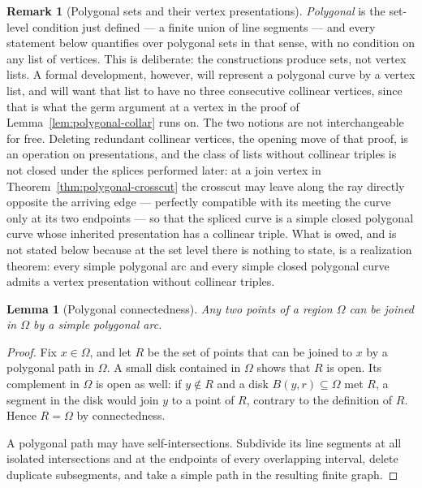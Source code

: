 \documentclass[11pt]{article}
\theoremstyle{mainplain}
\newtheorem{lemma}[theorem]{Lemma}
\theoremstyle{mainroman}
\theoremstyle{definition}
\newtheorem{remark}[theorem]{Remark}
\numberwithin{equation}{section}
\begin{document}
\begin{remark}[Polygonal sets and their vertex presentations]\label{rem:polygonal-presentation}
\emph{Polygonal} is the set-level condition just defined --- a finite
union of line segments --- and every statement below quantifies over
polygonal sets in that sense, with no condition on any list of
vertices. This is deliberate: the constructions produce sets, not
vertex lists. A formal development, however, will represent a
polygonal curve by a vertex list, and will want that list to have no
three consecutive collinear vertices, since that is what the germ
argument at a vertex in the proof of Lemma~\ref{lem:polygonal-collar}
runs on. The two notions are not interchangeable for free. Deleting
redundant collinear vertices, the opening move of that proof, is an
operation on presentations, and the class of lists without collinear
triples is not closed under the splices performed later: at a join
vertex in Theorem~\ref{thm:polygonal-crosscut} the crosscut may leave
along the ray directly opposite the arriving edge --- perfectly
compatible with its meeting the curve only at its two endpoints --- so
that the spliced curve is a simple closed polygonal curve whose
inherited presentation has a collinear triple. What is owed, and is
not stated below because at the set level there is nothing to state,
is a realization theorem: every simple polygonal arc and every simple
closed polygonal curve admits a vertex presentation without collinear
triples.
\end{remark}

\begin{lemma}[Polygonal connectedness]\label{lem:polygonal-connected}
Any two points of a region $\Omega$ can be joined in $\Omega$ by a
simple polygonal arc.
\end{lemma}
\begin{proof}
Fix $x\in\Omega$, and let $R$ be the set of points that can be joined
to $x$ by a polygonal path in $\Omega$. A small disk contained in
$\Omega$ shows that $R$ is open. Its complement in $\Omega$ is open as
well: if $y\notin R$ and a disk $B(y,r)\subseteq\Omega$ met $R$, a
segment in the disk would join $y$ to a point of $R$, contrary to the
definition of $R$. Hence $R=\Omega$ by connectedness.

A polygonal path may have self-intersections. Subdivide its line
segments at all isolated intersections and at the endpoints of every
overlapping interval, delete duplicate subsegments, and take a simple
path in the resulting finite graph.
\end{proof}
\end{document}
